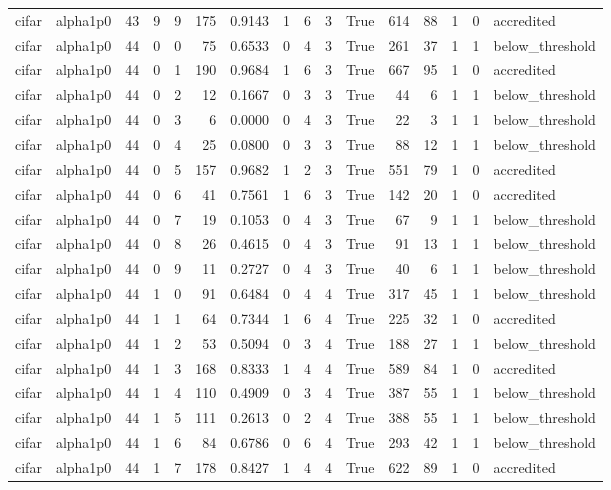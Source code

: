 \begin{tabular}{llrrrrrrrrrrrrrl}
cifar & alpha1p0 & 43 & 9 & 9 & 175 & 0.9143 & 1 & 6 & 3 & True & 614 & 88 & 1 & 0 & accredited \\
cifar & alpha1p0 & 44 & 0 & 0 & 75 & 0.6533 & 0 & 4 & 3 & True & 261 & 37 & 1 & 1 & below\_threshold \\
cifar & alpha1p0 & 44 & 0 & 1 & 190 & 0.9684 & 1 & 6 & 3 & True & 667 & 95 & 1 & 0 & accredited \\
cifar & alpha1p0 & 44 & 0 & 2 & 12 & 0.1667 & 0 & 3 & 3 & True & 44 & 6 & 1 & 1 & below\_threshold \\
cifar & alpha1p0 & 44 & 0 & 3 & 6 & 0.0000 & 0 & 4 & 3 & True & 22 & 3 & 1 & 1 & below\_threshold \\
cifar & alpha1p0 & 44 & 0 & 4 & 25 & 0.0800 & 0 & 3 & 3 & True & 88 & 12 & 1 & 1 & below\_threshold \\
cifar & alpha1p0 & 44 & 0 & 5 & 157 & 0.9682 & 1 & 2 & 3 & True & 551 & 79 & 1 & 0 & accredited \\
cifar & alpha1p0 & 44 & 0 & 6 & 41 & 0.7561 & 1 & 6 & 3 & True & 142 & 20 & 1 & 0 & accredited \\
cifar & alpha1p0 & 44 & 0 & 7 & 19 & 0.1053 & 0 & 4 & 3 & True & 67 & 9 & 1 & 1 & below\_threshold \\
cifar & alpha1p0 & 44 & 0 & 8 & 26 & 0.4615 & 0 & 4 & 3 & True & 91 & 13 & 1 & 1 & below\_threshold \\
cifar & alpha1p0 & 44 & 0 & 9 & 11 & 0.2727 & 0 & 4 & 3 & True & 40 & 6 & 1 & 1 & below\_threshold \\
cifar & alpha1p0 & 44 & 1 & 0 & 91 & 0.6484 & 0 & 4 & 4 & True & 317 & 45 & 1 & 1 & below\_threshold \\
cifar & alpha1p0 & 44 & 1 & 1 & 64 & 0.7344 & 1 & 6 & 4 & True & 225 & 32 & 1 & 0 & accredited \\
cifar & alpha1p0 & 44 & 1 & 2 & 53 & 0.5094 & 0 & 3 & 4 & True & 188 & 27 & 1 & 1 & below\_threshold \\
cifar & alpha1p0 & 44 & 1 & 3 & 168 & 0.8333 & 1 & 4 & 4 & True & 589 & 84 & 1 & 0 & accredited \\
cifar & alpha1p0 & 44 & 1 & 4 & 110 & 0.4909 & 0 & 3 & 4 & True & 387 & 55 & 1 & 1 & below\_threshold \\
cifar & alpha1p0 & 44 & 1 & 5 & 111 & 0.2613 & 0 & 2 & 4 & True & 388 & 55 & 1 & 1 & below\_threshold \\
cifar & alpha1p0 & 44 & 1 & 6 & 84 & 0.6786 & 0 & 6 & 4 & True & 293 & 42 & 1 & 1 & below\_threshold \\
cifar & alpha1p0 & 44 & 1 & 7 & 178 & 0.8427 & 1 & 4 & 4 & True & 622 & 89 & 1 & 0 & accredited \\

\end{tabular}
